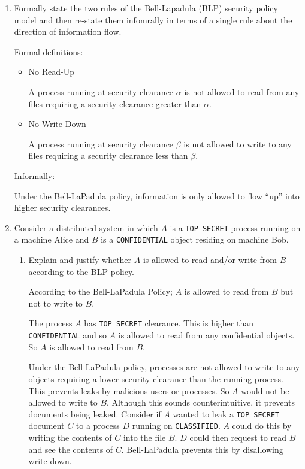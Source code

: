 \documentclass[10pt,\jkfside,a4paper]{article}
\begin{document}
\begin{enumerate}

\item Formally state the two rules of the Bell-Lapadula (BLP) security policy model 
and then re-state them infomrally in terms of a single rule about the direction of information flow.

Formal definitions:

\begin{itemize}

\item No Read-Up

A process running at security clearance $\alpha$ is not allowed to read from any files requiring a 
security clearance greater than $\alpha$.

\item No Write-Down

A process running at security clearance $\beta$ is not allowed to write to any files requiring a 
security clearance less than $\beta$.

\end{itemize}

Informally:

Under the Bell-LaPadula policy, information is only allowed to flow ``up'' into higher 
security clearances.

\item Consider a distributed system in which $A$ is a \texttt{TOP SECRET} process running on a 
machine Alice and $B$ is a \texttt{CONFIDENTIAL} object residing on machine Bob.

\begin{enumerate}

\item Explain and justify whether $A$ is allowed to read and/or write from $B$ according to the BLP 
policy.

According to the Bell-LaPadula Policy; $A$ is allowed to read from $B$ but not to write to $B$.

The process $A$ has \texttt{TOP SECRET} clearance. This is higher than \texttt{CONFIDENTIAL} and so 
$A$ is allowed to read from any confidential objects. So $A$ is allowed to read from $B$.

Under the Bell-LaPadula policy, processes are not allowed to write to any objects requiring a lower security 
clearance than the running process. This prevents leaks by malicious users or processes. So $A$ would not be 
allowed to write to $B$. Although this sounds counterintuitive, it prevents documents being leaked. Consider if 
$A$ wanted to leak a \texttt{TOP SECRET} document $C$ to a process $D$ running on \texttt{CLASSIFIED}. $A$ could do 
this by writing the contents of $C$ into the file $B$. $D$ could then request to read $B$ and see the contents of $C$. 
Bell-LaPadula prevents this by disallowing write-down.


\end{enumerate}
\end{enumerate}
\end{document}
